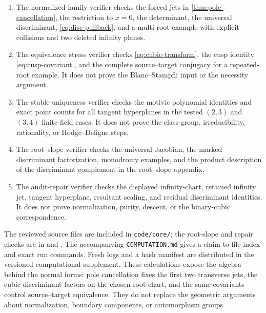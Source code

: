 \documentclass[11pt,reqno]{amsart}
\begin{document}
\begin{enumerate}[label=(\arabic*)]
\item The normalized-family verifier checks the forced jets in
\cref{thm:pole-cancellation}, the restriction to \(x=0\), the determinant,
the universal discriminant, \eqref{eq:disc-pullback}, and a multi-root
example with explicit collisions and two deleted infinity planes.
\item The equivalence stress verifier checks
\eqref{eq:cubic-transform}, the cusp identity
\eqref{eq:cusp-covariant}, and the complete source--target conjugacy for a
repeated-root example.  It does not prove the Blanc--Stampfli input or the
necessity argument.
\item The stable-uniqueness verifier checks the motivic polynomial
identities and exact point counts for all tangent hyperplanes in the tested
\((2,3)\) and \((3,4)\) finite-field cases.  It does not prove the
class-group, irreducibility, rationality, or Hodge--Deligne steps.
\item The root--slope verifier checks the universal Jacobian,
the marked discriminant factorization, monodromy examples, and the product
description of the discriminant complement in the root--slope appendix.
\item The audit-repair verifier checks the displayed infinity-chart,
retained infinity jet, tangent hyperplane, resultant scaling, and residual
discriminant identities.  It does not prove normalization, purity, descent,
or the binary-cubic correspondence.
\end{enumerate}

The reviewed source files are included in
\texttt{code/core/}; the root-slope and repair checks are in
 and
.  The accompanying
\texttt{COMPUTATION.md} gives a claim-to-file index and exact run commands.
Fresh logs and a hash manifest are distributed in the versioned
computational supplement.  These calculations expose the algebra behind the
normal forms: pole cancellation fixes the first two transverse jets, the
cubic discriminant factors on the chosen-root chart, and the same covariants
control source--target equivalence.  They do not replace the geometric
arguments about normalization, boundary components, or automorphism groups.

\appendix





\end{document}
